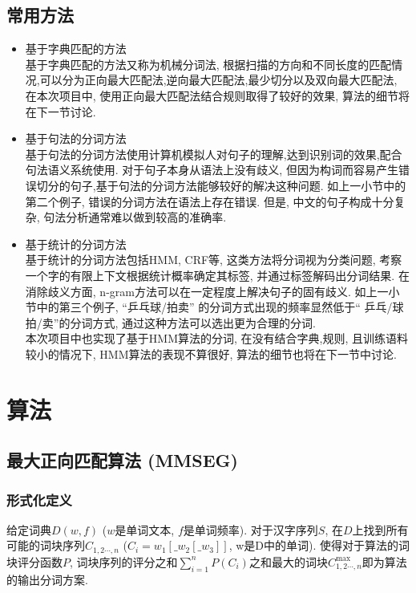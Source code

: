 \documentclass[titlepage]{article}
\begin{document}
\subsection{常用方法}
\begin{itemize}
\item 基于字典匹配的方法\\[1em]
  基于字典匹配的方法又称为机械分词法, 根据扫描的方向和不同长度的匹配情况,可以分为正向最大匹配法,逆向最大匹配法,最少切分以及双向最大匹配法, 在本次项目中, 使用正向最大匹配法结合规则取得了较好的效果, 算法的细节将在下一节讨论.
\item 基于句法的分词方法\\[1em]
  基于句法的分词方法使用计算机模拟人对句子的理解,达到识别词的效果,配合句法语义系统使用. 对于句子本身从语法上没有歧义, 但因为构词而容易产生错误切分的句子,基于句法的分词方法能够较好的解决这种问题. 如上一小节中的第二个例子, 错误的分词方法在语法上存在错误. 但是, 中文的句子构成十分复杂, 句法分析通常难以做到较高的准确率.
\item 基于统计的分词方法\\[1em]
    基于统计的分词方法包括HMM, CRF等, 这类方法将分词视为分类问题, 考察一个字的有限上下文根据统计概率确定其标签, 并通过标签解码出分词结果. 在消除歧义方面, n-gram方法可以在一定程度上解决句子的固有歧义. 如上一小节中的第三个例子, ``乒乓球/拍卖'' 的分词方式出现的频率显然低于`` 乒乓/球拍/卖''的分词方式, 通过这种方法可以选出更为合理的分词. \\

  本次项目中也实现了基于HMM算法的分词, 在没有结合字典,规则, 且训练语料较小的情况下, HMM算法的表现不算很好, 算法的细节也将在下一节中讨论.

\end{itemize}


\section{算法}
\subsection{最大正向匹配算法 (MMSEG)}
\subsubsection{形式化定义}
给定词典$D(w, f)$ ($w$是单词文本, $f$是单词频率). 对于汉字序列$S$, 在$D$上找到所有可能的词块序列$C_{1,2\cdots,n}$ ($C_i=w_1[\_w_2[\_w_3]]$, w是D中的单词). 使得对于算法的词块评分函数$P$, 词块序列的评分之和$\sum_{i=1}^n P(C_i)$之和最大的词块$C_{1,2\cdots,n}^{\max}$即为算法的输出分词方案.
\end{document}
